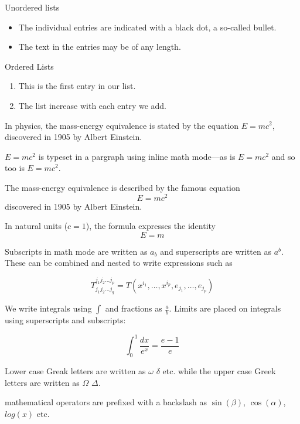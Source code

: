 \documentclass[12pt, letterpaper]{article}
\begin{document}
\newpage

Unordered lists
\begin{itemize}
    \item The individual entries are indicated with a black dot, a so-called
          bullet.

    \item The text in the entries may be of any length.
\end{itemize}

Ordered Lists
\begin{enumerate}
    \item This is the first entry in our list.
    \item The list increase with each entry we add.
\end{enumerate}


\newpage

In physics, the mass-energy equivalence is stated by the equation $E=mc^2$,
discovered in 1905 by Albert Einstein.

\begin{math}
E = mc^2
\end{math} is typeset in a pargraph using inline math mode---as is $E=mc^2$ and
so too is \(E=mc^2\).

The mass-energy equivalence is described by the famous equation \[E=mc^2\]
discovered in 1905 by Albert Einstein.

In natural units ($ c=1 $), the formula expresses the identity
\begin{equation}
    E=m
\end{equation}


\newpage

Subscripts in math mode are written as $a_b$ and superscripts are written as
$a^b$. These can be combined and nested to write expressions such as

\[
    T_{j_1 j_2 \ldots j_q}^{j_1 j_2 \ldots j_p}
    = T(x^{i_1},\ldots, x^{i_p},e_{j_1},\ldots,e_{j_p})
\]

We write integrals using $\int$ and fractions as $\frac{a}{b}$. Limits are
placed on integrals using superscripts and subscripts:

\[
    \int_0^1 \frac{dx}{e^x} = \frac{e-1}{e}
\]

Lower case Greak letters are written as $\omega$ $\delta$ etc. while the upper
case Greek letters are written as $\Omega$ $\Delta$.

mathematical operators are prefixed with a backslash as $\sin(\beta)$, 
$\cos(\alpha)$, $log(x)$ etc.
\end{document}
